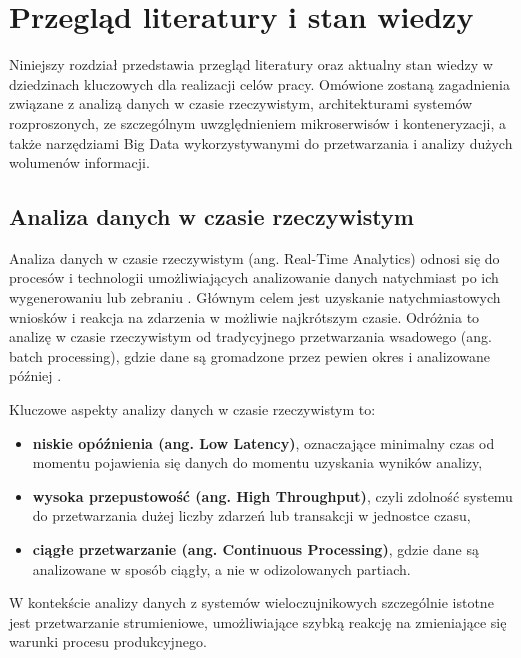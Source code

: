 \section{Przegląd literatury i stan wiedzy}
\label{sec:przeglad_literatury}

Niniejszy rozdział przedstawia przegląd literatury oraz aktualny stan wiedzy w dziedzinach kluczowych dla realizacji celów pracy. Omówione zostaną zagadnienia związane z analizą danych w czasie rzeczywistym, architekturami systemów rozproszonych, ze szczególnym uwzględnieniem mikroserwisów i konteneryzacji, a także narzędziami Big Data wykorzystywanymi do przetwarzania i analizy dużych wolumenów informacji.

\subsection{Analiza danych w czasie rzeczywistym}
\label{subsec:analiza_danych}

Analiza danych w czasie rzeczywistym (ang. Real-Time Analytics) odnosi się do procesów i technologii umożliwiających analizowanie danych natychmiast po ich wygenerowaniu lub zebraniu \cite{realtime_analytics}. Głównym celem jest uzyskanie natychmiastowych wniosków i reakcja na zdarzenia w możliwie najkrótszym czasie. Odróżnia to analizę w czasie rzeczywistym od tradycyjnego przetwarzania wsadowego (ang. batch processing), gdzie dane są gromadzone przez pewien okres i analizowane później \cite{data_processing_models}.

\vspace{0.3em}

Kluczowe aspekty analizy danych w czasie rzeczywistym to:

\begin{itemize}
    \item \textbf{niskie opóźnienia (ang. Low Latency)}, oznaczające minimalny czas od momentu pojawienia się danych do momentu uzyskania wyników analizy,
    \item \textbf{wysoka przepustowość (ang. High Throughput)}, czyli zdolność systemu do przetwarzania dużej liczby zdarzeń lub transakcji w jednostce czasu,
    \item \textbf{ciągłe przetwarzanie (ang. Continuous Processing)}, gdzie dane są analizowane w sposób ciągły, a nie w odizolowanych partiach.
\end{itemize}

W kontekście analizy danych z systemów wieloczujnikowych szczególnie istotne jest przetwarzanie strumieniowe, umożliwiające szybką reakcję na zmieniające się warunki procesu produkcyjnego.

